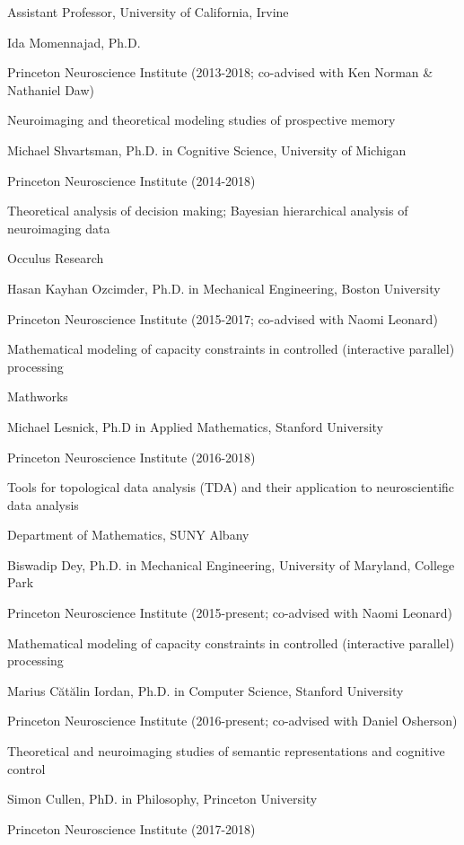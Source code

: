 \documentclass[10 pt]{article}
\begin{document}
Assistant Professor, University of California, Irvine
    \medskip

Ida Momennajad, Ph.D.

Princeton Neuroscience Institute (2013-2018; co-advised with Ken Norman \& Nathaniel Daw)

Neuroimaging and theoretical modeling studies of prospective memory
    \medskip

Michael Shvartsman, Ph.D. in Cognitive Science, University of Michigan

Princeton Neuroscience Institute (2014-2018)

Theoretical analysis of decision making; Bayesian hierarchical analysis of neuroimaging data

Occulus Research
    \medskip

Hasan Kayhan Ozcimder, Ph.D. in Mechanical Engineering, Boston University

Princeton Neuroscience Institute (2015-2017; co-advised with Naomi Leonard)

Mathematical modeling of capacity constraints in controlled (interactive parallel) processing

Mathworks
    \medskip

Michael Lesnick, Ph.D in Applied Mathematics, Stanford University

Princeton Neuroscience Institute (2016-2018)

Tools for topological data analysis (TDA) and their application to neuroscientific data analysis

Department of Mathematics, SUNY Albany
    \medskip

Biswadip Dey, Ph.D. in Mechanical Engineering, University of Maryland, College Park

Princeton Neuroscience Institute (2015-present; co-advised with Naomi Leonard)

Mathematical modeling of capacity constraints in controlled (interactive parallel) processing
    \medskip

Marius Cătălin Iordan, Ph.D. in Computer Science, Stanford University

Princeton Neuroscience Institute (2016-present; co-advised with Daniel Osherson)

Theoretical and neuroimaging studies of semantic representations and cognitive control
    \medskip

Simon Cullen, PhD. in Philosophy, Princeton University

Princeton Neuroscience Institute (2017-2018)
\end{document}
